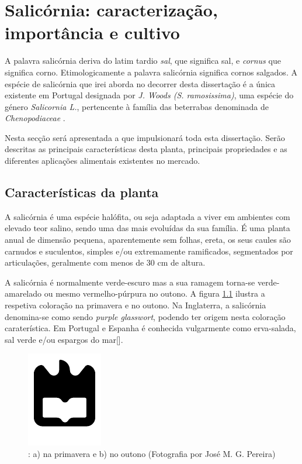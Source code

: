 
\chapter{Salicórnia: caracterização, importância e cultivo}

A palavra salicórnia deriva do latim tardio \textit{sal}, que significa sal, e \textit{cornus} que significa corno. Etimologicamente a palavra salicórnia significa cornos salgados\cite{chambers}. A espécie de salicórnia que irei aborda no decorrer desta dissertação é a única existente em Portugal designada por \sr \textit{J. Woods (S. ramosissima)}\cite{JoaoSilva}, uma espécie do género \textit{Salicornia L.}, pertencente à família das beterrabas denominada de \textit{Chenopodiaceae} \cite{chenopodiaceae}.

Nesta secção será apresentada a \sr que impulsionará toda esta dissertação. Serão descritas as principais características desta planta, principais propriedades e as diferentes aplicações alimentais existentes no mercado. 

\section{Características da planta}


A salicórnia é uma espécie halófita, ou seja adaptada a viver em ambientes com elevado teor salino\cite{ferri}, sendo uma das mais evoluídas da sua família. É uma planta anual de dimensão pequena, aparentemente sem folhas, ereta, os seus caules são carnudos e suculentos, simples e/ou extremamente ramificados, segmentados por articulações\cite{Silva2000}, geralmente com menos de 30 cm de altura\cite{overviewsal}.

A salicórnia é normalmente verde-escuro mas a sua ramagem torna-se  verde-amarelado ou mesmo vermelho-púrpura no outono. A figura \ref{primoutono} ilustra a respetiva coloração na primavera e no outono. Na Inglaterra, a salicórnia denomina-se como sendo \textit{purple glasswort}, podendo ter origem nesta coloração caraterística. Em Portugal e Espanha é conhecida vulgarmente como erva-salada, sal verde e/ou espargos do mar[]. 


\begin{figure}[!htb]
	\centering
	\includegraphics{uaLogoNew.pdf}
	\caption{\sr: a) na primavera e b) no outono (Fotografia por José M. G. Pereira)}
	\label{primoutono}
\end{figure}


